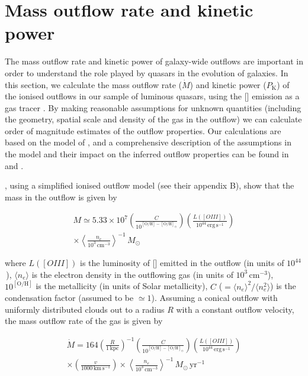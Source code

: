 \section{Mass outflow rate and kinetic power}

The mass outflow rate and kinetic power of galaxy-wide outflows are important in order to understand the role played by quasars in the evolution of galaxies.
In this section, we calculate the mass outflow rate ($\dot{M}$) and kinetic power ($P_{\text{K}}$) of the ionised outflows in our sample of luminous quasars, using the [] emission as a gas tracer \citep[e.g.][]{harrison12,cano-diaz12,liu13,brusa15,carniani15,bischetti16,kakkad16}.
By making reasonable assumptions for unknown quantities (including the geometry, spatial scale and density of the gas in the outflow) we can calculate order of magnitude estimates of the outflow properties.
Our calculations are based on the model of \citet{cano-diaz12}, and a comprehensive description of the assumptions in the model and their impact on the inferred outflow properties can be found in \citet{cano-diaz12} and \citet{kakkad16}.

\citet{cano-diaz12}, using a simplified ionised outflow model (see their appendix B), show that the mass in the outflow is given by

\begingroup\makeatletter{}\check@mathfonts
\begin{eqnarray}
M \simeq 5.33 \times 10^7 \left( \frac{C}{10^{[\text{O/H}] - [\text{O/H}]_\odot}} \right) \left( \frac{L([OIII])}{10^{44}\, \text{erg}\,\text{s}^{-1}}\right) \nonumber \\ \times \left\langle \frac{n_e}{10^3\, \text{cm}^{-3}} \right\rangle^{-1} \, M_\odot
\end{eqnarray}
\endgroup

\noindent where $L([OIII])$ is the luminosity of [] emitted in the outflow (in units of $10^{44}$\,\ergs), $\langle n_e \rangle$ is the electron density in the outflowing gas (in units of $10^3$\,cm$^{-3}$), $10^{[\text{O/H}]}$ is the metallicity (in units of Solar metallicity), $C$ ($=\langle n_e \rangle ^2 / \langle n_e^2\rangle$) is the condensation factor (assumed to be $\simeq1$).
Assuming a conical outflow with uniformly distributed clouds out to a radius $R$ with a constant outflow velocity, the mass outflow rate of the gas is given by

\begingroup\makeatletter{}\check@mathfonts
\begin{eqnarray}
\dot{M} = 164 \left( \frac{R}{1\,\text{kpc}} \right)^{-1} \left( \frac{C}{10^{[\text{O/H}] - [\text{O/H}]_\odot}} \right) \left( \frac{L([OIII])}{10^{44}\, \text{erg}\,\text{s}^{-1}}\right) \nonumber \\ \times \left( \frac{v}{1000\,\text{km}\,\text{s}^{-1}}\right) \times \left\langle  \frac{n_e}{10^3\, \text{cm}^{-3}} \right\rangle^{-1} \, M_\odot \, \text{yr}^{-1}
\end{eqnarray}
\endgroup

